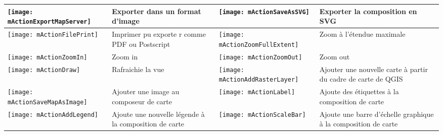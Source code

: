 {\begin{table}[h]
\begin{tabular}{|l|p{6.9cm}|l|p{6.9cm}|}
\hline \texttt{[image: mActionExportMapServer]}  & Exporter dans un
format d'image & 
 \texttt{[image: mActionSaveAsSVG]} & Exporter la composition en 
SVG \\
 \hline \texttt{[image: mActionFilePrint]} & Imprimer pu exporte
r comme PDF ou Postscript &
\texttt{[image: mActionZoomFullExtent]} & Zoom à l'étendue
maximale\\
\hline \texttt{[image: mActionZoomIn]} & Zoom in &
 \texttt{[image: mActionZoomOut]} & Zoom out \\
 \hline \texttt{[image: mActionDraw]} & Rafraichie la vue &
 \texttt{[image: mActionAddRasterLayer]} & Ajouter une nouvelle 
carte à partir du cadre de carte de QGIS \\
 \hline \texttt{[image: mActionSaveMapAsImage]} & Ajouter une image
au composeur de carte &
\texttt{[image: mActionLabel]} & Ajoute des étiquettes à la
composition de carte \\
\hline \texttt{[image: mActionAddLegend]} & Ajoute une nouvelle 
légende à la composition de carte &
 \texttt{[image: mActionScaleBar]} & Ajoute une barre
d'échelle graphique à la composition de carte\\

\end{tabular}
\end{table}}
